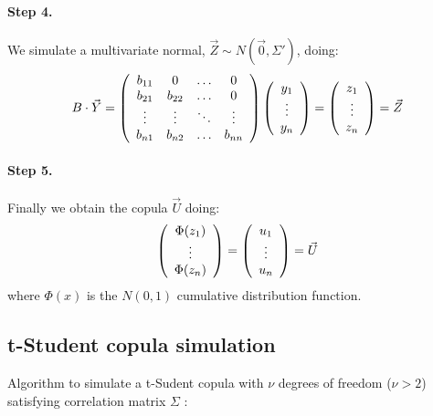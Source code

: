 \documentclass[a4paper,12pt,final]{article}
\begin{document}
\paragraph{Step 4.} We simulate a multivariate normal, $\vec{Z} \sim N(\vec{0}, \Sigma')$, 
doing:
\begin{displaymath}
B \cdot \vec{Y} 
=
\left(
\begin{array}{cccc}
b_{11}   & 0        & \ldots & 0       \cr
b_{21}   & b_{22}   & \ldots & 0       \cr
\vdots  & \vdots  & \ddots & \vdots \cr
b_{n1}   & b_{n2}   & \ldots & b_{nn}
\end{array}
\right)
\left(
\begin{array}{c}
y_1 \cr
\vdots \cr
y_n
\end{array}
\right) 
=
\left(
\begin{array}{c}
z_1 \cr
\vdots \cr
z_n
\end{array}
\right) 
= 
\vec{Z}
\end{displaymath}

\paragraph{Step 5.} Finally we obtain the copula $\vec{U}$ doing:
\begin{displaymath}
\left(
\begin{array}{c}
\Phi(z_1) \cr
\vdots \cr
\Phi(z_n)
\end{array}
\right) 
=
\left(
\begin{array}{c}
u_1 \cr
\vdots \cr
u_n
\end{array}
\right) 
=
\vec{U} 
\end{displaymath}
where $\Phi(x)$ is the $N(0,1)$ cumulative distribution function.

\subsection{t-Student copula simulation}
\label{ap:tstudentcopu}
Algorithm to simulate a t-Sudent copula with $\nu$ degrees of freedom ($\nu > 2$) 
satisfying correlation matrix $\Sigma$ \cite{copu:pricing}:
\end{document}
